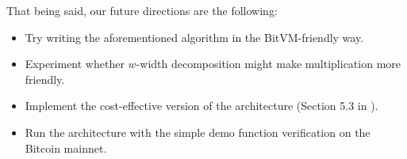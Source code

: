 \documentclass{iacrtrans}
\begin{document}
That being said, our future directions are the following:
\begin{itemize}
  \item Try writing the aforementioned algorithm in the BitVM-friendly way.
  \item Experiment whether $w$-width decomposition might make multiplication more friendly.
  \item Implement the cost-effective version of the architecture (Section 5.3 in \cite{bitvm2}).
  \item Run the architecture with the simple demo function verification on the Bitcoin mainnet.
\end{itemize}

\printbibliography{}
\end{document}
